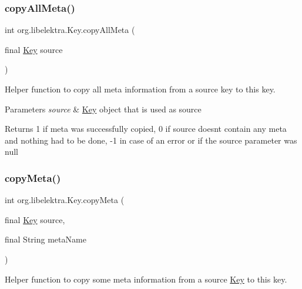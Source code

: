 \subsubsection{\texorpdfstring{copy\+All\+Meta()}{copyAllMeta()}}
{\footnotesize\ttfamily int org.\+libelektra.\+Key.\+copy\+All\+Meta (\begin{DoxyParamCaption}\item[{final \hyperlink{classorg_1_1libelektra_1_1Key}{Key}}]{source }\end{DoxyParamCaption})\hspace{0.3cm}{\ttfamily [inline]}}



Helper function to copy all meta information from a source key to this key. 


\begin{DoxyParams}{Parameters}
{\em source} & \hyperlink{classorg_1_1libelektra_1_1Key}{Key} object that is used as source \\
\hline
\end{DoxyParams}
\begin{DoxyReturn}{Returns}
1 if meta was successfully copied, 0 if source doesn\textquotesingle{}t contain any meta and nothing had to be done, -\/1 in case of an error or if the source parameter was null 
\end{DoxyReturn}
\mbox{\label{classorg_1_1libelektra_1_1Key_a421a4240ce01f2f196bdce7b3c1d02c2}} 
\subsubsection{\texorpdfstring{copy\+Meta()}{copyMeta()}}
{\footnotesize\ttfamily int org.\+libelektra.\+Key.\+copy\+Meta (\begin{DoxyParamCaption}\item[{final \hyperlink{classorg_1_1libelektra_1_1Key}{Key}}]{source,  }\item[{final String}]{meta\+Name }\end{DoxyParamCaption})\hspace{0.3cm}{\ttfamily [inline]}}



Helper function to copy some meta information from a source \hyperlink{classorg_1_1libelektra_1_1Key}{Key} to this key. 


